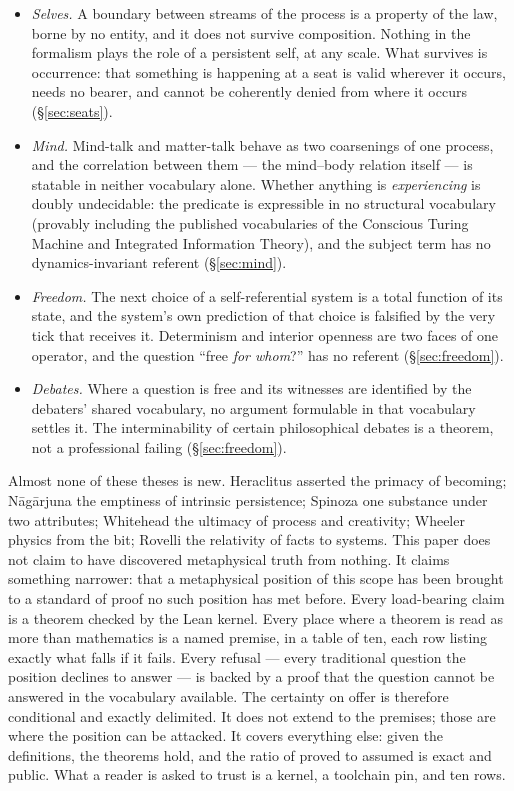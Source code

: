 \documentclass[11pt]{article}
\theoremstyle{remark}
\begin{document}
\begin{itemize}[leftmargin=1.6em, itemsep=2pt]
\item \emph{Selves.} A boundary between streams of the process is a property of the law, borne by no entity, and it does not survive composition. Nothing in the formalism plays the role of a persistent self, at any scale. What survives is occurrence: that something is happening at a seat is valid wherever it occurs, needs no bearer, and cannot be coherently denied from where it occurs (\S\ref{sec:seats}).
\item \emph{Mind.} Mind-talk and matter-talk behave as two coarsenings of one process, and the correlation between them --- the mind--body relation itself --- is statable in neither vocabulary alone. Whether anything is \emph{experiencing} is doubly undecidable: the predicate is expressible in no structural vocabulary (provably including the published vocabularies of the Conscious Turing Machine and Integrated Information Theory), and the subject term has no dynamics-invariant referent (\S\ref{sec:mind}).
\item \emph{Freedom.} The next choice of a self-referential system is a total function of its state, and the system's own prediction of that choice is falsified by the very tick that receives it. Determinism and interior openness are two faces of one operator, and the question ``free \emph{for whom}?'' has no referent (\S\ref{sec:freedom}).
\item \emph{Debates.} Where a question is free and its witnesses are identified by the debaters' shared vocabulary, no argument formulable in that vocabulary settles it. The interminability of certain philosophical debates is a theorem, not a professional failing (\S\ref{sec:freedom}).
\end{itemize}

Almost none of these theses is new. Heraclitus asserted the primacy of becoming; N\=ag\=arjuna the emptiness of intrinsic persistence; Spinoza one substance under two attributes; Whitehead the ultimacy of process and creativity; Wheeler physics from the bit; Rovelli the relativity of facts to systems. This paper does not claim to have discovered metaphysical truth from nothing. It claims something narrower: that a metaphysical position of this scope has been brought to a standard of proof no such position has met before. Every load-bearing claim is a theorem checked by the Lean kernel. Every place where a theorem is read as more than mathematics is a named premise, in a table of ten, each row listing exactly what falls if it fails. Every refusal --- every traditional question the position declines to answer --- is backed by a proof that the question cannot be answered in the vocabulary available. The certainty on offer is therefore conditional and exactly delimited. It does not extend to the premises; those are where the position can be attacked. It covers everything else: given the definitions, the theorems hold, and the ratio of proved to assumed is exact and public. What a reader is asked to trust is a kernel, a toolchain pin, and ten rows.
\end{document}

